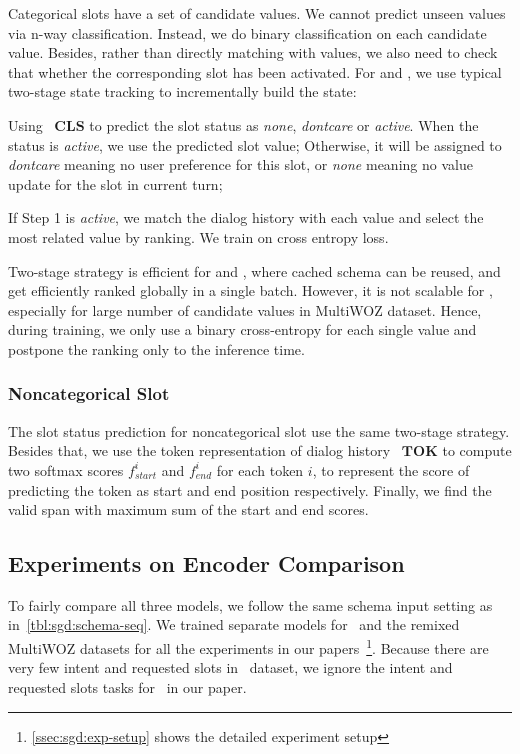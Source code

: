 Categorical slots have a set of candidate values. We cannot predict
unseen values via n-way classification. Instead, we do binary
classification on each candidate value. Besides, rather than directly
matching with values, we also need to check that whether the
corresponding slot has been activated. For \CE and \FE, we use typical
two-stage state tracking to incrementally build the state:
\begin{inparaenum}[{\bf Step} 1.]
\item Using ~$\mathbf{CLS}$ to predict the slot status as
  \textit{none}, \textit{dontcare} or \textit{active}. When the status is
  \textit{active}, we use the predicted slot value; Otherwise, it
  will be assigned to \textit{dontcare} meaning no user preference for this
  slot, or \textit{none} meaning no value update for the slot in current turn;
\item If Step 1 is \textit{active}, we match the dialog
  history with each value and select the most related value by ranking. We train on cross entropy loss.
\end{inparaenum}
Two-stage strategy is efficient for \DE and \FE, where cached schema
can be reused, and get efficiently ranked globally in a single
batch. However, it is not scalable for \CE, especially for large
number of candidate values in MultiWOZ dataset. Hence, during
training, we only use a binary cross-entropy for each single value and
postpone the ranking only to the inference time.

\subsubsection{Noncategorical Slot}
\label{sssec:sgd:noncategorical-slot}
The slot status prediction for
noncategorical slot use the same two-stage strategy. Besides that, we
use the token representation of dialog history ~$\mathbf{TOK}$ to
compute two softmax scores $f^{i}_{start}$ and $f^{i}_{end}$ for each
token $i$, to represent the score of predicting the token as start and
end position respectively. Finally, we find the valid span with
maximum sum of the start and end scores.

\subsection{Experiments on Encoder Comparison}
\label{ssec:encoder-results}
To fairly compare all three models, we follow the same schema input
setting as in~\autoref{tbl:sgd:schema-seq}. We trained separate models
for \sgdst~and the remixed MultiWOZ datasets for all the experiments
in our papers~\footnote{\autoref{ssec:sgd:exp-setup} shows the detailed
  experiment setup}. Because there are very few intent and requested
slots in \multiwoz~dataset, we ignore the intent and requested slots
tasks for \multiwoz~in our paper.


